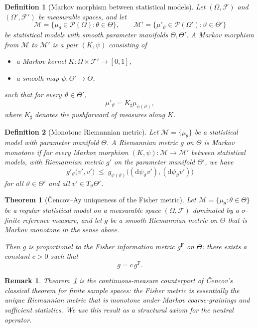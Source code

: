\documentclass[11pt]{article}
\newtheorem{definition}{Definition}
\newtheorem{theorem}{Theorem}
\newtheorem{remark}{Remark}
\newcommand{\Pcal}{\mathcal{P}}
\begin{document}
\begin{definition}[Markov morphism between statistical models]
Let $(\Omega,\mathcal F)$ and $(\Omega',\mathcal F')$ be measurable
spaces, and let
\[
  \mathcal M
  = \{\mu_\theta \in \Pcal(\Omega) : \theta\in\Theta\},
  \qquad
  \mathcal M'
  = \{\mu'_{\vartheta} \in \Pcal(\Omega') : \vartheta\in\Theta'\}
\]
be statistical models with smooth parameter manifolds $\Theta,\Theta'$.
A \emph{Markov morphism} from $\mathcal M$ to $\mathcal M'$ is a pair
$(K,\psi)$ consisting of
\begin{itemize}[leftmargin=1.5em]
  \item a Markov kernel $K:\Omega\times\mathcal F' \to [0,1]$,
  \item a smooth map $\psi:\Theta'\to\Theta$,
\end{itemize}
such that for every $\vartheta\in\Theta'$,
\[
  \mu'_{\vartheta}
  = K_\sharp \mu_{\psi(\vartheta)},
\]
where $K_\sharp$ denotes the pushforward of measures along $K$.
\end{definition}

\begin{definition}[Monotone Riemannian metric]
Let $\mathcal M = \{\mu_\theta\}$ be a statistical model with parameter
manifold $\Theta$. A Riemannian metric $g$ on $\Theta$ is
\emph{Markov monotone} if for every Markov morphism
$(K,\psi):\mathcal M\to\mathcal M'$ between statistical models, with
Riemannian metric $g'$ on the parameter manifold $\Theta'$, we have
\[
  g'_{\vartheta}\bigl( v',v' \bigr)
  \;\le\;
  g_{\psi(\vartheta)}\bigl( (\mathrm d\psi_{\vartheta} v'),
                            (\mathrm d\psi_{\vartheta} v') \bigr)
\]
for all $\vartheta\in\Theta'$ and all $v'\in T_{\vartheta}\Theta'$.
\end{definition}

\begin{theorem}[Čencov--Ay uniqueness of the Fisher metric]
\label{thm:cencov-ay}
Let $\mathcal M = \{\mu_\theta : \theta\in\Theta\}$ be a regular
statistical model on a measurable space $(\Omega,\mathcal F)$ dominated
by a $\sigma$-finite reference measure, and let $g$ be a smooth
Riemannian metric on $\Theta$ that is Markov monotone in the sense
above.

Then $g$ is proportional to the Fisher information metric $g^{\mathrm F}$
on $\Theta$:
there exists a constant $c>0$ such that
\[
  g = c\, g^{\mathrm F}.
\]
\end{theorem}

\begin{remark}
Theorem~\ref{thm:cencov-ay} is the continuous-measure counterpart of
Čencov's classical theorem for finite sample spaces: the Fisher metric is
essentially the unique Riemannian metric that is monotone under Markov
coarse-grainings and sufficient statistics. We use this result as a
structural axiom for the neutral operator.
\end{remark}
\end{document}
